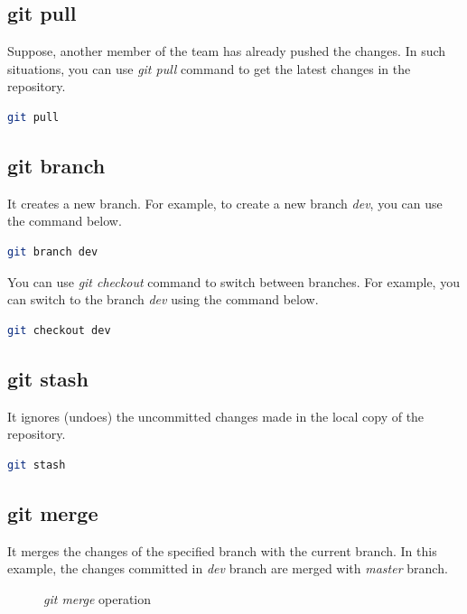 \documentclass[letterpaper]{article}
\begin{document}
\subsection{git pull}
Suppose, another member of the team has already pushed the changes. In such situations, you can use \textit{git pull} command to get the latest changes in the repository. 

\begin{lstlisting}[language=Bash]
git pull
\end{lstlisting}

\subsection{git branch}
It creates a new branch. For example, to create a new branch \textit{dev}, you can use the command below. 

\begin{lstlisting}[language=Bash]
git branch dev
\end{lstlisting}

You can use \textit{git checkout} command to switch between branches. For example, you can switch to the branch \textit{dev} using the command below.

\begin{lstlisting}[language=Bash]
git checkout dev
\end{lstlisting}

\subsection{git stash}
It ignores (undoes) the uncommitted changes made in the local copy of the repository.

\begin{lstlisting}[language=Bash]
git stash
\end{lstlisting}

\subsection{git merge}
It merges the changes of the specified branch with the current branch. In this example, the changes committed in \textit{dev} branch are merged with \textit{master} branch. 

\begin{figure}[h]
    \centering
    \caption{\textit{git merge} operation}
  \end{figure}
\end{document}
